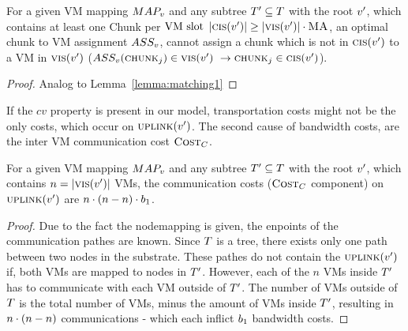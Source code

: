 \begin{lemma}
\label{lemma:matching2}
For a given VM mapping $MAP_v$ and any subtree $T' \subseteq 
T$ with the root $v'$, which contains at least one Chunk per 
$\text{VM slot}$ $|\textsc{cis}(v')| \geq |\textsc{vis}(v')| 
\cdot \textsc{MA}$, an 
optimal chunk to VM assignment $ASS_v$, cannot assign a chunk 
which is not in $\textsc{cis}(v')$ to a VM in 
$\textsc{vis}(v')$ ($ASS_v(\textsc{chunk}_j) \in 
\textsc{vis}(v')~ \rightarrow \textsc{chunk}_j \in 
\textsc{cis}(v')$).
\end{lemma}

\begin{proof}
 Analog to Lemma~\ref{lemma:matching1}
\end{proof}

If the $cv$ property is present in our model, transportation costs might not be 
the only costs, which occur on $\textsc{uplink}(v')$. The second cause of 
bandwidth costs, are the inter VM communication cost $\textsc{Cost}_C$.

\begin{corollary}
\label{corollary:comCost}
 For a given VM mapping $MAP_v$ and any subtree $T' \subseteq 
T$ with the root $v'$, which contains $n 
= |\textsc{vis}(v')|$ VMs, the communication costs ($\textsc{Cost}_C$ 
component) on 
$\textsc{uplink}(v')$ are $n \cdot (n - n) 
\cdot 
b_1$.
\end{corollary}

\begin{proof}
Due to the fact the nodemapping is given, the enpoints of the communication 
pathes are known. Since $T$ is a tree, there exists only one path between 
two nodes in the substrate. These pathes do not contain the 
$\textsc{uplink}(v')$ if, both VMs are mapped to nodes in $T'$. 
However, each of the $n$ VMs inside $T'$ has to communicate with each VM 
outside of $T'$. The number of VMs outside of $T$ is the total number 
of VMs, minus the amount of VMs inside $T'$, resulting in $n \cdot (n - 
n)$ communications - which each inflict $b_1$ bandwidth costs.
\end{proof}

%
\newcommand{\NodesToProcess}{\ensuremath{\textsc{nodesToProcess}}}

